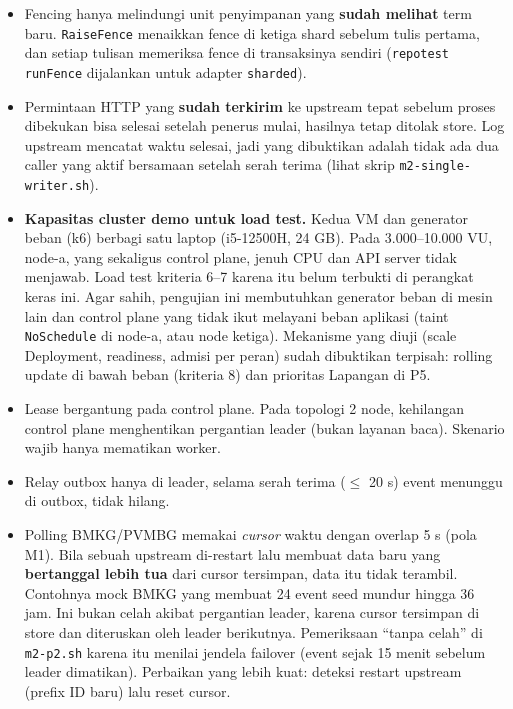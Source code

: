 \begin{itemize}
\item Fencing hanya melindungi unit penyimpanan yang \textbf{sudah melihat} term baru. \texttt{Raise\allowbreak{}Fence} menaikkan fence di ketiga shard sebelum tulis pertama, dan setiap tulisan memeriksa fence di transaksinya sendiri (\texttt{repotest} \texttt{run\allowbreak{}Fence} dijalankan untuk adapter \texttt{sharded}).
\item Permintaan HTTP yang \textbf{sudah terkirim} ke upstream tepat sebelum proses dibekukan bisa selesai setelah penerus mulai, hasilnya tetap ditolak store. Log upstream mencatat waktu selesai, jadi yang dibuktikan adalah tidak ada dua caller yang aktif bersamaan setelah serah terima (lihat skrip \texttt{m2-\allowbreak{}single-\allowbreak{}writer.\allowbreak{}sh}).
\item \textbf{Kapasitas cluster demo untuk load test.} Kedua VM dan generator beban (k6) berbagi satu laptop (i5-12500H, 24 GB). Pada 3.000--10.000 VU, node-a, yang sekaligus control plane, jenuh CPU dan API server tidak menjawab. Load test kriteria 6--7 karena itu belum terbukti di perangkat keras ini. Agar sahih, pengujian ini membutuhkan generator beban di mesin lain dan control plane yang tidak ikut melayani beban aplikasi (taint \texttt{No\allowbreak{}Schedule} di node-a, atau node ketiga). Mekanisme yang diuji (scale Deployment, readiness, admisi per peran) sudah dibuktikan terpisah: rolling update di bawah beban (kriteria 8) dan prioritas Lapangan di P5.
\item Lease bergantung pada control plane. Pada topologi 2 node, kehilangan control plane menghentikan pergantian leader (bukan layanan baca). Skenario wajib hanya mematikan worker.
\item Relay outbox hanya di leader, selama serah terima ($\le$ 20 s) event menunggu di outbox, tidak hilang.
\item Polling BMKG/PVMBG memakai \emph{cursor} waktu dengan overlap 5 s (pola M1). Bila sebuah upstream di-restart lalu membuat data baru yang \textbf{bertanggal lebih tua} dari cursor tersimpan, data itu tidak terambil. Contohnya mock BMKG yang membuat 24 event seed mundur hingga 36 jam. Ini bukan celah akibat pergantian leader, karena cursor tersimpan di store dan diteruskan oleh leader berikutnya. Pemeriksaan ``tanpa celah'' di \texttt{m2-\allowbreak{}p2.\allowbreak{}sh} karena itu menilai jendela failover (event sejak 15 menit sebelum leader dimatikan). Perbaikan yang lebih kuat: deteksi restart upstream (prefix ID baru) lalu reset cursor.

\end{itemize}
